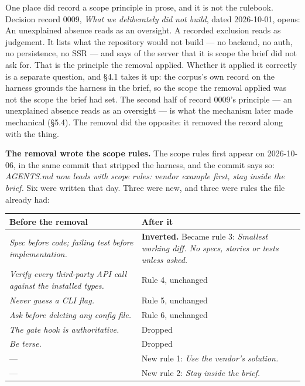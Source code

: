 \documentclass[11pt,a4paper]{article}
\begin{document}
One place did record a scope principle in prose, and it is not the rulebook. Decision record 0009, \emph{What we deliberately did not build}, dated 2026-10-01, opens: \textquotedbl{}An unexplained absence reads as an oversight. A recorded exclusion reads as judgement.\textquotedbl{} It lists what the repository would not build --- no backend, no auth, no persistence, no SSR --- and says of the server that it is \textquotedbl{}scope the brief did not ask for\textquotedbl{}. That is the principle the removal applied. Whether it applied it correctly is a separate question, and \S{}4.1 takes it up: the corpus's own record on the harness grounds the harness in the brief, so the scope the removal applied was not the scope the brief had set. The second half of record 0009's principle --- an unexplained absence reads as an oversight --- is what the mechanism later made mechanical (\S{}5.4). The removal did the opposite: it removed the record along with the thing.

\textbf{The removal wrote the scope rules.} The scope rules first appear on 2026-10-06, in the same commit that stripped the harness, and the commit says so: \emph{\textquotedbl{}AGENTS.md now leads with scope rules: vendor example first, stay inside the brief.\textquotedbl{}} Six were written that day. Three were new, and three were rules the file already had:

\begin{tabular}{@{}>{\raggedright\arraybackslash}p{}>{\raggedright\arraybackslash}p{}@{}}
\toprule
\textbf{Before the removal} & \textbf{After it} \\
\midrule
\emph{Spec before code; failing test before implementation.} & \textbf{Inverted.} Became rule 3: \emph{Smallest working diff. No specs, stories or tests unless asked.} \\
\emph{Verify every third-party API call against the installed types.} & Rule 4, unchanged \\
\emph{Never guess a CLI flag.} & Rule 5, unchanged \\
\emph{Ask before deleting any config file.} & Rule 6, unchanged \\
\emph{The gate hook is authoritative.} & Dropped \\
\emph{Be terse.} & Dropped \\
--- & New rule 1: \emph{Use the vendor's solution.} \\
--- & New rule 2: \emph{Stay inside the brief.} \\
\bottomrule
\end{tabular}
\end{document}
